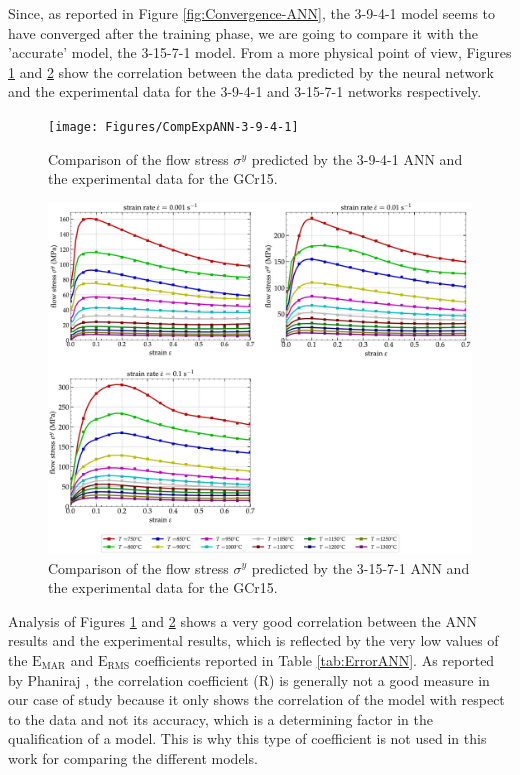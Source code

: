 \documentclass[algorithms,article,submit,pdftex,moreauthors]{Definitions/mdpi}
\DeclareRobustCommand{\RMSE}{\text{E}_\text{RMS}}
\DeclareRobustCommand{\MARE}{\text{E}_\text{MAR}}
\DeclareRobustCommand{\R}{\text{R}}
\begin{document}
Since, as reported in Figure \ref{fig:Convergence-ANN}, the 3-9-4-1 model seems to have converged after the training phase, we are going to compare it with the 'accurate' model, the 3-15-7-1 model.
From a more physical point of view, Figures \ref{fig:CompExpANN-9-4} and \ref{fig:CompExpANN-15-7} show the correlation between the data predicted by the neural network and the experimental data for the 3-9-4-1 and 3-15-7-1 networks respectively.
\begin{figure}[!ht]
\centering
\texttt{[image: Figures/CompExpANN-3-9-4-1]}
\caption{Comparison of the flow stress $\sigma^y$ predicted by the 3-9-4-1 ANN and the experimental data for the GCr15.}
\label{fig:CompExpANN-9-4}
\end{figure}
\begin{figure}[!ht]
\centering
\includegraphics[width=\columnwidth]{Figures/CompExpANN-3-15-7-1}
\caption{Comparison of the flow stress $\sigma^y$ predicted by the 3-15-7-1 ANN and the experimental data for the GCr15.}
\label{fig:CompExpANN-15-7}
\end{figure}
Analysis of Figures \ref{fig:CompExpANN-9-4} and \ref{fig:CompExpANN-15-7} shows a very good correlation between the ANN results and the experimental results, which is reflected by the very low values of the $\MARE$ and $\RMSE$ coefficients reported in Table \ref{tab:ErrorANN}.
As reported by Phaniraj \cite{Phaniraj-2003}, the correlation coefficient ($\R$) is generally not a good measure in our case of study because it only shows the correlation of the model with respect to the data and not its accuracy, which is a determining factor in the qualification of a model.
This is why this type of coefficient is not used in this work for comparing the different models.
\end{document}
